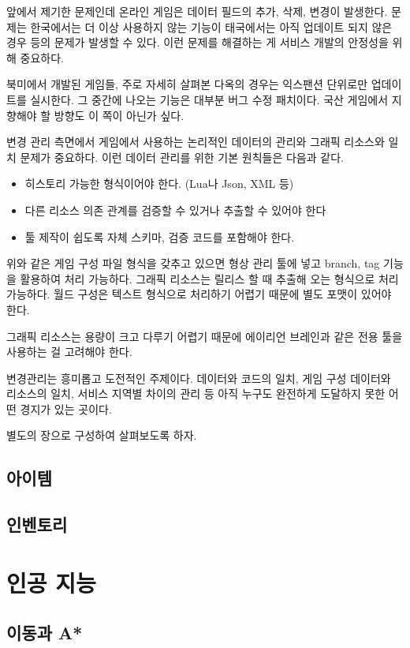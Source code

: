 \documentclass[chapter,kosection, 10.5pt, romanfixed, a4paper]{oblivoir}
\begin{document}
앞에서 제기한 문제인데 온라인 게임은 데이터 필드의 추가, 삭제, 변경이 발생한다. 문제는 한국에서는 더 이상
사용하지 않는 기능이 태국에서는 아직 업데이트 되지 않은 경우 등의 문제가 발생할 수 있다. 이런 문제를 해결하는 게 
서비스 개발의 안정성을 위해 중요하다.

북미에서 개발된 게임들, 주로 자세히 살펴본 다옥의 경우는 익스팬션 단위로만 업데이트를 실시한다. 그 중간에 
나오는 기능은 대부분 버그 수정 패치이다. 국산 게임에서 지향해야 할 방향도 이 쪽이 아닌가 싶다. 

변경 관리 측면에서 게임에서 사용하는 논리적인 데이터의 관리와 그래픽 리소스와 일치 문제가 중요하다. 이런 데이터 
관리를 위한 기본 원칙들은 다음과 같다. 
\begin{itemize}
\item 히스토리 가능한 형식이어야 한다. (Lua나 Json, XML 등)
\item 다른 리소스 의존 관계를 검증할 수 있거나 추출할 수 있어야 한다
\item 툴 제작이 쉽도록 자체 스키마, 검증 코드를 포함해야 한다. 
\end{itemize}

위와 같은 게임 구성 파일 형식을 갖추고 있으면 형상 관리 툴에 넣고 branch, tag 기능을 활용하여 처리 가능하다. 
그래픽 리소스는 릴리스 할 때 추출해 오는 형식으로 처리 가능하다. 월드 구성은 텍스트 형식으로 처리하기 어렵기 
때문에 별도 포맷이 있어야 한다. 

그래픽 리소스는 용량이 크고 다루기 어렵기 때문에 에이리언 브레인과 같은 전용 툴을 사용하는 걸 고려해야 한다. 

변경관리는 흥미롭고 도전적인 주제이다. 데이터와 코드의 일치, 게임 구성 데이터와 리소스의 일치, 서비스 지역별 
차이의 관리 등 아직 누구도 완전하게 도달하지 못한 어떤 경지가 있는 곳이다. 

별도의 장으로 구성하여 살펴보도록 하자. 

\subsection{아이템}

\subsection{인벤토리}

\section{인공 지능}

\subsection{이동과 A*}
\end{document}
